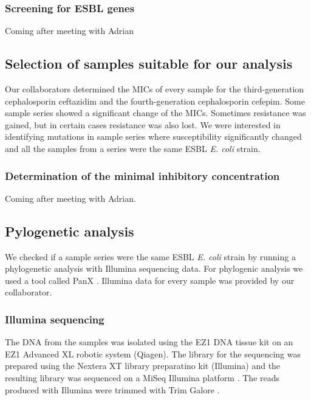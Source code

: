 \subsubsection{Screening for ESBL genes}
Coming after meeting with Adrian
\subsection{Selection of samples suitable for our analysis}
Our collaborators determined the MICs of every sample for the third-generation cephalosporin ceftazidim and the fourth-generation cephalosporin cefepim. Some sample series showed a significant change of the MICs. Sometimes resistance was gained, but in certain cases resistance was also lost. We were interested in identifying mutations in sample series where susceptibility significantly changed and all the samples from a series were the same ESBL \textit{E. coli} strain.
\subsubsection{Determination of the minimal inhibitory concentration}
Coming after meeting with Adrian.

\subsection{Pylogenetic analysis}
We checked if a sample series were the same ESBL \textit{E. coli} strain by running a phylogenetic analysis with Illumina sequencing data. For phylogenic analysis we used a tool called PanX \cite{ding_panx:_2018}. Illumina data for every sample was provided by our collaborator.
\subsubsection{Illumina sequencing}
The DNA from the samples was isolated using the EZ1 DNA tissue kit on an EZ1 Advanced XL robotic system (Qiagen). The library for the sequencing was prepared using the Nextera XT library preparatino kit (Illumina) and the resulting library was sequenced on a MiSeq Illumina platform \cite{nanopore}. The reads produced with Illumina were trimmed with Trim Galore \cite{noauthor_babraham_nodate}.
